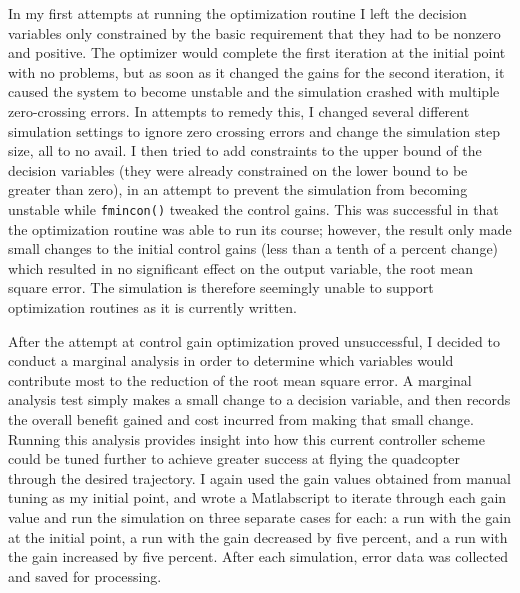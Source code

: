 \documentclass[onecolumn,10pt]{IEEEtran}
\newcommand{\MATLAB}{Matlab}
\begin{document}
In my first attempts at running the optimization routine I left the decision variables only constrained by the basic requirement that they had to be nonzero and positive. The optimizer would complete the first iteration at the initial point with no problems, but as soon as it changed the gains for the second iteration, it caused the system to become unstable and the simulation crashed with multiple zero-crossing errors. In attempts to remedy this, I changed several different simulation settings to ignore zero crossing errors and change the simulation step size, all to no avail. I then tried to add constraints to the upper bound of the decision variables (they were already constrained on the lower bound to be greater than zero), in an attempt to prevent the simulation from becoming unstable while \lstinline{fmincon()} tweaked the control gains. This was successful in that the optimization routine was able to run its course; however, the result only made small changes to the initial control gains (less than a tenth of a percent change) which resulted in no significant effect on the output variable, the root mean square error. The simulation is therefore seemingly unable to support optimization routines as it is currently written.

After the attempt at control gain optimization proved unsuccessful, I decided to conduct a marginal analysis in order to determine which variables would contribute most to the reduction of the root mean square error. A marginal analysis test simply makes a small change to a decision variable, and then records the overall benefit gained and cost incurred from making that small change. Running this analysis provides insight into how this current controller scheme could be tuned further to achieve greater success at flying the quadcopter through the desired trajectory. I again used the gain values obtained from manual tuning as my initial point, and wrote a \MATLAB script to iterate through each gain value and run the simulation on three separate cases for each: a run with the gain at the initial point, a run with the gain decreased by five percent, and a run with the gain increased by five percent. After each simulation, error data was collected and saved for processing. 
\end{document}
